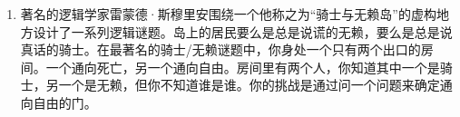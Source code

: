 \begin{enumerate}
    
    仅使用这些新的联结词（以及否定和变量符号本身）来找出 $(A\, \land {\lnot}B) \lor C$ 的一个表达式。
    
    \textbookpagebreak
    \workbookpagebreak
    
    
    \item \label{IKK}     
    著名的逻辑学家雷蒙德·斯穆里安围绕一个他称之为“骑士与无赖岛”的虚构地方设计了一系列逻辑谜题。岛上的居民要么是总是说谎的无赖，要么是总是说真话的骑士。在最著名的骑士/无赖谜题中，你身处一个只有两个出口的房间。一个通向死亡，另一个通向自由。房间里有两个人，你知道其中一个是骑士，另一个是无赖，但你不知道谁是谁。你的挑战是通过问一个问题来确定通向自由的门。
    
    \end{enumerate}